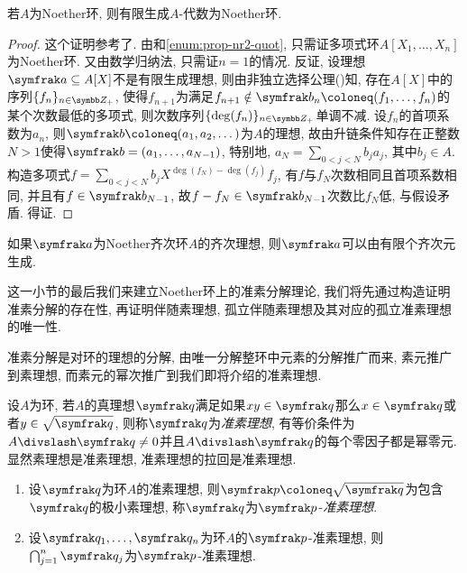\begin{theorem}\label{thm:hilbertbasis}
  若$A$为Noether环, 则有限生成$A$-代数为Noether环.
\end{theorem}

\begin{proof}
  这个证明参考了. 由和\ref{enum:prop-nr2-quot}, 只需证多项式环$A[X_1, \dotsc, X_n]$为Noether环. 又由数学归纳法, 只需证$n=1$的情况. 反证, 设理想$\ideal{a}\subseteq A[X]$不是有限生成理想, 则由非独立选择公理()知, 存在$A[X]$中的序列$\{f_n\}_{n\in\ZZ_+}$, 使得$f_{n+1}$为满足$f_{n+1}\notin \ideal{b}_n\coloneq (f_1, \dotsc, f_{n})$的某个次数最低的多项式, 则次数序列$\{\deg(f_n)\}_{n\in\ZZ_+}$单调不减. 设$f_n$的首项系数为$a_n$, 则$\ideal{b}\coloneq (a_1, a_2, \dotsc)$为$A$的理想, 故由升链条件知存在正整数$N>1$使得$\ideal{b}=(a_1, \dotsc, a_{N-1})$, 特别地, $a_N=\sum_{0<j<N}b_ja_j$, 其中$b_j\in A$. 构造多项式$f=\sum_{0<j<N}b_jX^{\deg(f_N)-\deg(f_j)}f_j$, 有$f$与$f_N$次数相同且首项系数相同, 并且有$f\in\ideal{b}_{N-1}$, 故$f-f_N\in\ideal{b}_{N-1}$次数比$f_N$低, 与假设矛盾. 得证.
\end{proof}

\begin{propositionnoproof}
  如果$\ideal{a}$为Noether齐次环$A$的齐次理想, 则$\ideal{a}$可以由有限个齐次元生成.
\end{propositionnoproof}

这一小节的最后我们来建立Noether环上的准素分解理论, 我们将先通过构造证明准素分解的存在性, 再证明伴随素理想, 孤立伴随素理想及其对应的孤立准素理想的唯一性.

准素分解是对环的理想的分解, 由唯一分解整环中元素的分解推广而来, 素元推广到素理想, 而素元的幂次推广到我们即将介绍的准素理想.

\begin{definition}
  设$A$为环, 若$A$的真理想$\ideal{q}$满足如果$xy\in \ideal{q}$那么$x\in\ideal{q}$或者$y\in\sqrt{\ideal{q}}$, 则称$\ideal{q}$为\emph{准素理想}, 有等价条件为$A{\divslash}\ideal{q}\neq 0$并且$A{\divslash}\ideal{q}$的每个零因子都是幂零元. 显然素理想是准素理想, 准素理想的拉回是准素理想.
\end{definition}

\begin{proposition}\label{prop:primary}\leavevmode
  \begin{enumerate}
    \item 设$\ideal{q}$为环$A$的准素理想, 则$\ideal{p}\coloneq \sqrt{\ideal{q}}$为包含$\ideal{q}$的极小素理想, 称$\ideal{q}$为$\ideal{p}$-\emph{准素理想}.
    \item\label{enum:prim-inte} 设$\ideal{q}_1, \dotsc, \ideal{q}_n$为环$A$的$\ideal{p}$-准素理想, 则$\bigcap_{j=1}^n\ideal{q}_j$为$\ideal{p}$-准素理想.
  \end{enumerate}
\end{proposition}

